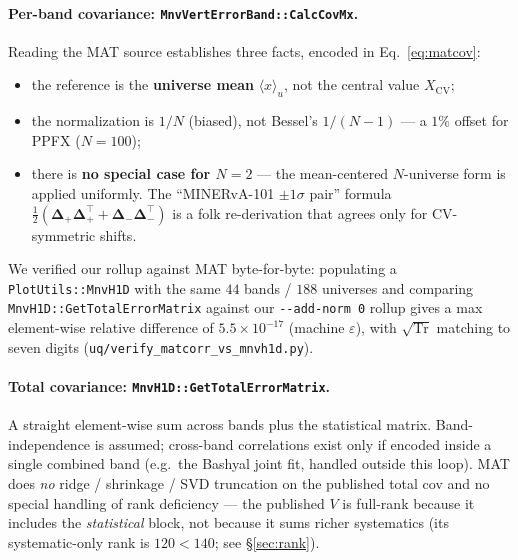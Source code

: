 \documentclass[12pt]{article}
\newcommand{\CV}{\text{CV}}
\newcommand{\T}{^{\!\top}}
\newcommand{\Tr}{\mathrm{Tr}}
\begin{document}
\paragraph{Per-band covariance: \texttt{MnvVertErrorBand::CalcCovMx}.}
Reading the MAT source establishes three facts, encoded in
Eq.~\eqref{eq:matcov}:
\begin{itemize}[nosep]
  \item the reference is the \textbf{universe mean}
        $\langle x\rangle_{u}$, not the central value $X_{\CV}$;
  \item the normalization is \textbf{$1/N$} (biased), not Bessel's
        $1/(N-1)$ --- a $1\%$ offset for PPFX ($N=100$);
  \item there is \textbf{no special case for $N=2$} --- the
        mean-centered $N$-universe form is applied uniformly. The
        ``MINERvA-101 $\pm1\sigma$ pair'' formula
        $\tfrac12(\boldsymbol{\Delta}_{+}\boldsymbol{\Delta}_{+}\T +
        \boldsymbol{\Delta}_{-}\boldsymbol{\Delta}_{-}\T)$ is a folk
        re-derivation that agrees only for CV-symmetric shifts.
\end{itemize}
We verified our rollup against MAT byte-for-byte: populating a
\texttt{PlotUtils::MnvH1D} with the same $44$ bands / $188$ universes
and comparing \texttt{MnvH1D::GetTotalErrorMatrix} against our
\texttt{-{}-add-norm 0} rollup gives a max element-wise relative
difference of $5.5\times10^{-17}$ (machine $\varepsilon$), with
$\sqrt{\Tr}$ matching to seven digits
(\texttt{uq/verify\_matcorr\_vs\_mnvh1d.py}).

\paragraph{Total covariance: \texttt{MnvH1D::GetTotalErrorMatrix}.}
A straight element-wise sum across bands plus the statistical matrix.
Band-independence is assumed; cross-band correlations exist only if
encoded inside a single combined band (e.g.\ the Bashyal joint fit,
handled outside this loop). MAT does \emph{no} ridge / shrinkage / SVD
truncation on the published total cov and no special handling of rank
deficiency --- the published $V$ is full-rank because it includes the
\emph{statistical} block, not because it sums richer systematics (its
systematic-only rank is $120<140$; see \S\ref{sec:rank}).
\end{document}
